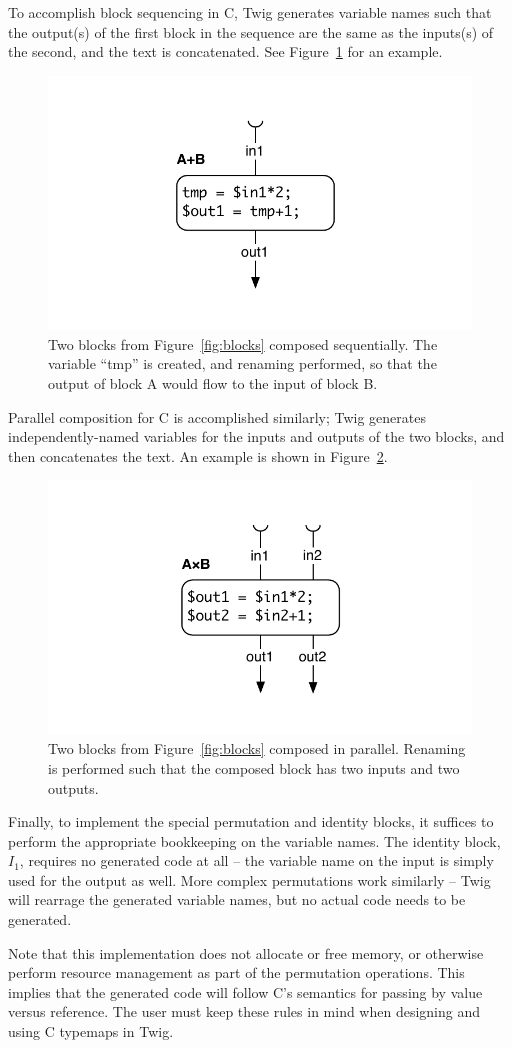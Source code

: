 To accomplish block sequencing in C, Twig generates variable names such that the output(s) of the first block in the sequence are the same as the inputs(s) of the second, and the text is concatenated. See Figure~\ref{fig:codegen-seq} for an example.

\begin{figure}[ht]
\centering
\includegraphics[width=0.75\columnwidth]{images/code-gen2}
\caption{Two blocks from Figure~\ref{fig:blocks} composed sequentially. The variable ``tmp'' is created, and renaming performed, so that the output of block A would flow to the input of block B.}
\label{fig:codegen-seq}
\end{figure}

Parallel composition for C is accomplished similarly; Twig generates independently-named variables for the inputs and outputs of the two blocks, and then concatenates the text. An example is shown in Figure~\ref{fig:codegen-par}.

\begin{figure}[ht]
\centering
\includegraphics[width=0.75\columnwidth]{images/code-gen3}
\caption{Two blocks from Figure~\ref{fig:blocks} composed in parallel. Renaming is performed such that the composed block has two inputs and two outputs.}
\label{fig:codegen-par}
\end{figure}

Finally, to implement the special permutation and identity blocks, it suffices to perform the appropriate bookkeeping on the variable names. The identity block, $I_1$, requires no generated code at all -- the variable name on the input is simply used for the output as well. More complex permutations work similarly -- Twig will rearrage the generated variable names, but no actual code needs to be generated.

Note that this implementation does not allocate or free memory, or otherwise perform resource management as part of the permutation operations. This implies that the generated code will follow C's semantics for passing by value versus reference. The user must keep these rules in mind when designing and using C typemaps in Twig.
